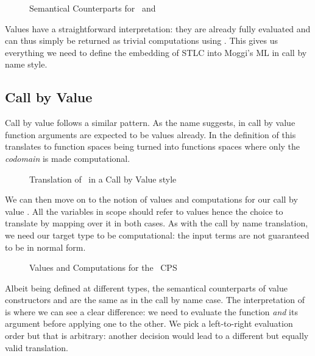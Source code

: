 \begin{figure}[h]
\caption{Semantical Counterparts for ~and \label{fig:cbnelim}}
\end{figure}

Values have a straightforward interpretation: they are already fully evaluated
and can thus simply be returned as trivial computations using . This
gives us everything we need to define the embedding of STLC into Moggi's ML in
call by name style.

\subsection{Call by Value}

Call by value follows a similar pattern. As the name suggests, in call by value
function arguments are expected to be values already. In the definition of 
this translates to function spaces being turned into functions spaces where only
the \emph{codomain} is made computational.

\begin{figure}[h]
\caption{Translation of ~in a Call by Value style\label{fig:moggicbv}}
\end{figure}

We can then move on to the notion of values and computations for our call by value
. All the variables in scope should refer to values hence the choice
to translate  by mapping  over it in both cases. As with the call by
name translation, we need our target type to be computational: the input terms are
not guaranteed to be in normal form.

\begin{figure}[h]
\caption{Values and Computations for the ~CPS \label{fig:moggicbvalue}}
\end{figure}

Albeit being defined at different types, the semantical counterparts of value
constructors and  are the same as in the call by name case. The
interpretation of  is where we can see a clear difference: we need
to evaluate the function \emph{and} its argument before applying one to the
other. We pick a left-to-right evaluation order but that is arbitrary: another
decision would lead to a different but equally valid translation.


